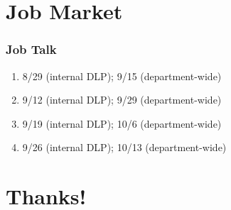 \documentclass{beamer}
\begin{document}
\section{Job Market}

\begin{frame}
    \label{update_scott}
    \frametitle{Job Talk}
    \begin{enumerate}
        \item 8/29 (internal DLP); 9/15 (department-wide)
        \item 9/12 (internal DLP); 9/29 (department-wide)
        \item 9/19 (internal DLP); 10/6 (department-wide)
        \item 9/26 (internal DLP); 10/13 (department-wide)
    \end{enumerate}
\end{frame}



\section{Thanks!}
\end{document}
